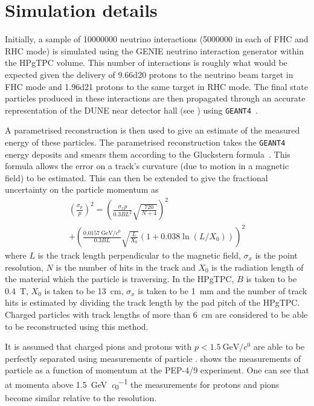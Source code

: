 \section{Simulation details}
\label{sec:dune_ndrwt:simDetails}

Initially, a sample of \num{10000000} neutrino interactions (\num{5000000} in each of FHC and RHC mode) is simulated using the GENIE neutrino interaction generator within the HPgTPC volume.
This number of interactions is roughly what would be expected given the delivery of \num{9.66d20} protons to the neutrino beam target in FHC mode and \num{1.96d21} protons to the same target in RHC mode.
The final state particles produced in these interactions are then propagated through an accurate representation of the DUNE near detector hall (see ) using \texttt{GEANT4}~\cite{geant}. 
 
A parametrised reconstruction is then used to give an estimate of the measured energy of these particles.
The parametrised reconstruction takes the \texttt{GEANT4} energy deposits and smears them according to the Gluckstern formula~\cite{gluckstern}.
This formula allows the error on a track's curvature (due to motion in a magnetic field) to be estimated.
This can then be extended to give the fractional uncertainty on the particle momentum as
\begin{multline}
	\left(\frac{\sigma_{p}}{p}\right)^{2} = \left( \frac{\sigma_{x} p}{0.3 B L^{2}} \sqrt{ \frac{720}{N+4} } \right)^{2} \\
	+ \left( \frac{\SI{0.0157}{\GeV\per\clight}}{0.3BL}\sqrt{\frac{L}{X_{0}}}\left( 1 + 0.038 \ln(L/X_{0}) \right) \right)^{2}
\end{multline}
where $L$ is the track length perpendicular to the magnetic field, $\sigma_{x}$ is the point resolution, $N$ is the number of hits in the track and $X_0$ is the radiation length of the material which the particle is traversing.
In the HPgTPC, $B$ is taken to be \SI{0.4}{\tesla}, $X_{0}$ is taken to be \SI{13}{\cm}, $\sigma_{x}$ is taken to be \SI{1}{\mm} and the number of track hits is estimated by dividing the track length by the pad pitch of the HPgTPC.
Charged particles with track lengths of more than \SI{6}{\cm} are considered to be able to be reconstructed using this method.

It is assumed that charged pions and protons with $p < \SI{1.5}{\GeV\per\clight}$ are able to be perfectly separated using measurements of particle \dedx.
 shows the measurements of particle \dedx as a function of momentum at the PEP-4/9 experiment. 
One can see that at momenta above \SI{1.5}{\GeV\per\clight} the \dedx measurements for protons and pions become similar relative to the \dedx resolution.

